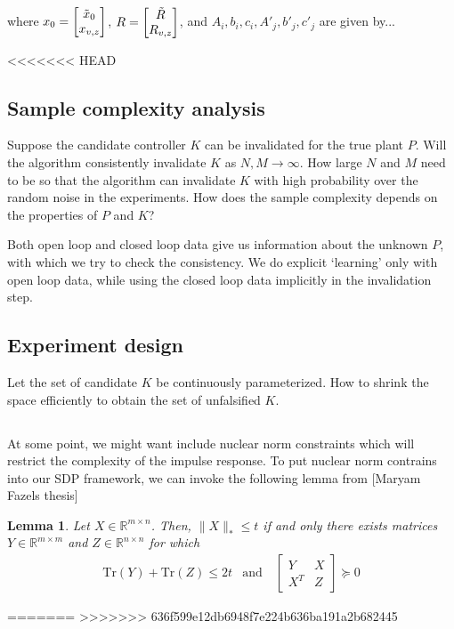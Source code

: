 \documentclass[11pt, onecolumn]{article}
\theoremstyle{plain}
\theoremstyle{plain}
\newtheorem{lem}[thm]{Lemma}
\theoremstyle{definition}
\begin{document}
where $x_0 = \begin{bmatrix}\tilde x_0\\ x_{v,z}\end{bmatrix}$, $R = \begin{bmatrix}\tilde R\\R_{v,z}\end{bmatrix}$, and $A_i,b_i,c_i,A'_j,b'_j,c'_j$ are given by...

<<<<<<< HEAD
\subsection{Sample complexity analysis}

Suppose the candidate controller $K$ can be invalidated for the true plant $P$.   Will
the algorithm consistently invalidate $K$ as $N,M\to\infty$.  How large $N$ and $M$ need to be so that the
algorithm can invalidate $K$ with high probability over the random noise in the experiments. How
does the sample complexity depends on the properties of $P$ and $K$?

Both open loop and closed loop data give us information about the unknown $P$, with which we try to
check the consistency.  We do explicit `learning' only with open loop data, while using the closed
loop data implicitly in the invalidation step.


\subsection{Experiment design}

Let the set of candidate $K$ be continuously parameterized. How to shrink the space efficiently to
obtain the set of unfalsified $K$.


\subsection{}
At some point, we might want include nuclear norm constraints which will restrict the complexity of the impulse response. To put nuclear norm contrains into our SDP framework, we can invoke the following lemma from [Maryam Fazels thesis]
\begin{lem} Let $X \in \mathbb{R}^{m \times n}$. Then, $\|X\|_* \le t$ if and only there exists matrices $Y \in \mathbb{R}^{m \times m}$ and $Z \in \mathbb{R}^{n\times n}$ for which
\begin{eqnarray}
\mathrm{Tr}(Y) + \mathrm{Tr}(Z) \le 2t & \text{and} \quad \begin{bmatrix} Y & X \\ X^T & Z \end{bmatrix} \succeq 0
\end{eqnarray}
\end{lem}

=======
>>>>>>> 636f599e12db6948f7e224b636ba191a2b682445
\end{document}

